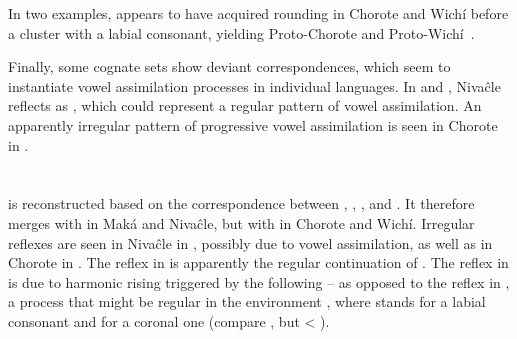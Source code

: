 In two examples,  appears to have acquired rounding in Chorote and Wichí before a cluster with a labial consonant, yielding Proto-Chorote and Proto-Wichí~.

\begin{exe}
    \ex \bite
    \ex \tooth
\end{exe}

Finally, some cognate sets show deviant correspondences, which seem to instantiate vowel assimilation processes in individual languages. In  and , Nivaĉle reflects  as , which could represent a regular pattern of vowel assimilation. An apparently irregular pattern of progressive vowel assimilation is seen in Chorote in .

\begin{exe}
    \ex \wildmanioc \label{e-wildmanioc}
    \ex \lip \label{e-lip}
    \ex \river \label{e-river}
\end{exe}

\section{}\label{pm-ae}

 is reconstructed based on the correspondence between , , , and . It therefore merges with  in Maká and Nivaĉle, but with  in Chorote and Wichí. Irregular reflexes are seen in Nivaĉle in , possibly due to vowel assimilation, as well as in Chorote in . The reflex  in  is apparently the regular continuation of . The reflex  in  is due to harmonic rising triggered by the following  – as opposed to the reflex  in , a process that might be regular in the environment , where  stands for a labial consonant and  for a coronal one (compare , but  < ).

\begin{exe}
    \ex \burn
    \ex \wing
    \ex \yicaay
    \ex \goawayyou
    \ex \goawaycisl
    \ex \putv
    \ex \flyv \label{ae-flyv}
    \ex \tell
    \ex \sisinlaw \label{ae-sisinlaw}
    \ex \soninlaw \label{ae-soninlaw}
    \ex \fieldn
    \ex \rootn \label{ae-rootn}
    \ex \coldweather
    \ex \crab
    \ex \killbird
    \ex \spouse
    \ex \stretchout
    \ex \dividev
    \ex \chaniarf
    \ex \chaniart
    \ex \flu
    \ex \nightmonkey
    \ex \hither
    \ex \smellv
    \ex \tapeti
    \ex \mesh
    \ex \acquainted
    \ex \abdcavity
    \ex \basetrunk
    \ex \trunk
    \ex \allrcpr
    \ex \burrow
    \ex \walk
    \ex \seev
    \ex \placen
    \ex \egg \label{ae-egg}
    \ex \vrbpl
    \ex \headn
    \ex \eatvi
\end{exe}

